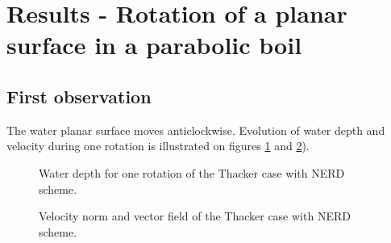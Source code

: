 \section{Results - Rotation of a planar surface in a parabolic boil}

\subsection{First observation}

The water planar surface moves anticlockwise. Evolution of water depth and velocity during one rotation 
is illustrated on figures \ref{fig:thacker:WDTime} and \ref{fig:thacker:VelocityTime}).


\begin{figure}[h!]
\begin{minipage}[t]{0.5\textwidth}
 \centering
\end{minipage}%
\begin{minipage}[t]{0.5\textwidth}
 \centering
\end{minipage}
\begin{minipage}[t]{0.5\textwidth}
 \centering
\end{minipage}%
\begin{minipage}[t]{0.5\textwidth}
 \centering
\end{minipage}
  \caption{Water depth for one rotation of the Thacker case with NERD scheme.}
  \label{fig:thacker:WDTime}
\end{figure}

\begin{figure}[H]
\begin{minipage}[t]{0.5\textwidth}
 \centering
\end{minipage}%
\begin{minipage}[t]{0.5\textwidth}
 \centering
\end{minipage}
\begin{minipage}[t]{0.5\textwidth}
 \centering
\end{minipage}%
\begin{minipage}[t]{0.5\textwidth}
 \centering
\end{minipage}
  \caption{Velocity norm and vector field of the Thacker case with NERD scheme.}
  \label{fig:thacker:VelocityTime}
\end{figure}

